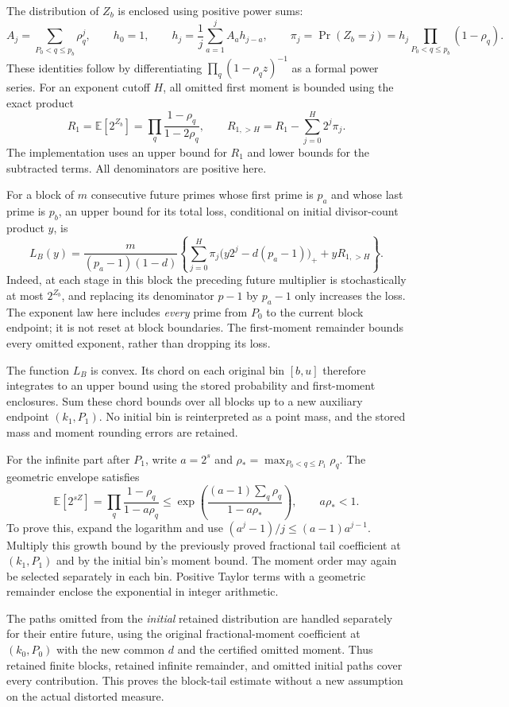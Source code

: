 \documentclass[11pt]{article}
\newcommand{\E}{\mathbb E}
\begin{document}
The distribution of $Z_b$ is enclosed using positive power sums:
\[
 A_j=\sum_{P_0<q\leq p_b}\rho_q^j,\qquad h_0=1,\qquad
 h_j=\frac1j\sum_{a=1}^j A_a h_{j-a},\qquad
 \pi_j=\Pr(Z_b=j)=h_j\prod_{P_0<q\leq p_b}(1-\rho_q).
\]
These identities follow by differentiating
$\prod_q(1-\rho_q z)^{-1}$ as a formal power series. For an exponent
cutoff $H$, all omitted first moment is bounded using the exact product
\[
 R_1=\E[2^{Z_b}]=\prod_q\frac{1-\rho_q}{1-2\rho_q},\qquad
 R_{1,>H}=R_1-\sum_{j=0}^H2^j\pi_j.
\]
The implementation uses an upper bound for $R_1$ and lower bounds for
the subtracted terms. All denominators are positive here.

For a block of $m$ consecutive future primes whose first prime is $p_a$
and whose last prime is $p_b$, an upper bound for its total loss,
conditional on initial divisor-count product $y$, is
\[
 L_B(y)=\frac{m}{(p_a-1)(1-d)}
 \left\{\sum_{j=0}^H\pi_j\bigl(y2^j-d(p_a-1)\bigr)_+
                          +yR_{1,>H}\right\}.
\]
Indeed, at each stage in this block the preceding future multiplier is
stochastically at most $2^{Z_b}$, and replacing its denominator $p-1$
by $p_a-1$ only increases the loss. The exponent law here includes
\emph{every} prime from $P_0$ to the current block endpoint; it is not
reset at block boundaries. The first-moment remainder bounds every
omitted exponent, rather than dropping its loss.

The function $L_B$ is convex. Its chord on each original bin $[b,u]$
therefore integrates to an upper bound using the stored probability and
first-moment enclosures. Sum these chord bounds over all blocks up to a
new auxiliary endpoint $(k_1,P_1)$. No initial bin is reinterpreted as a
point mass, and the stored mass and moment rounding errors are retained.

For the infinite part after $P_1$, write $a=2^s$ and
$\rho_* = \max_{P_0<q\leq P_1}\rho_q$. The geometric envelope satisfies
\[
 \E[2^{sZ}] =\prod_q\frac{1-\rho_q}{1-a\rho_q}
 \leq\exp\!\left(\frac{(a-1)\sum_q\rho_q}{1-a\rho_*}\right),
 \qquad a\rho_*<1.
\]
To prove this, expand the logarithm and use
$(a^j-1)/j\leq(a-1)a^{j-1}$. Multiply this growth bound by the previously
proved fractional tail coefficient at $(k_1,P_1)$ and by the initial
bin's moment bound. The moment order may again be selected separately
in each bin. Positive Taylor terms with a geometric remainder enclose
the exponential in integer arithmetic.

The paths omitted from the \emph{initial} retained distribution are
handled separately for their entire future, using the original
fractional-moment coefficient at $(k_0,P_0)$ with the new common $d$ and
the certified omitted moment. Thus retained finite blocks, retained
infinite remainder, and omitted initial paths cover every contribution.
This proves the block-tail estimate without a new assumption on the
actual distorted measure.
\end{document}
